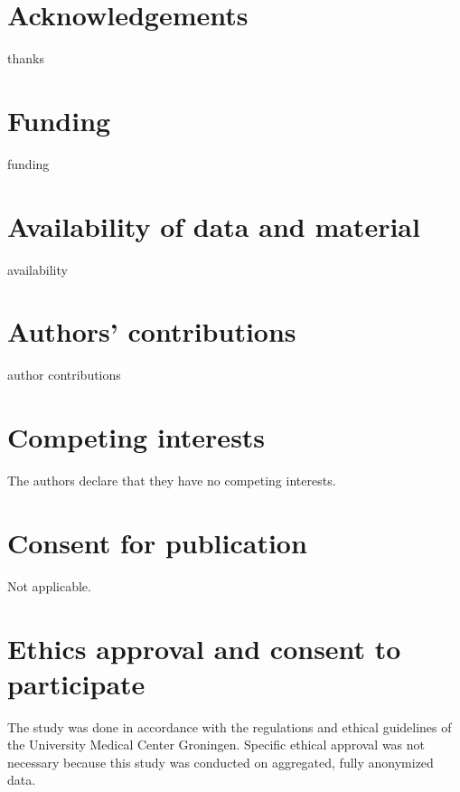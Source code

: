 \section*{Acknowledgements}
thanks

\section*{Funding}
funding

\section*{Availability of data and material}
availability

\section*{Authors’ contributions}
author contributions

\section*{Competing interests}
The authors declare that they have no competing interests.

\section*{Consent for publication}
Not applicable.

\section*{Ethics approval and consent to participate}
The study was done in accordance with the regulations and ethical guidelines of the University Medical Center Groningen.
Specific ethical approval was not necessary because this study was conducted on aggregated, fully anonymized data.
